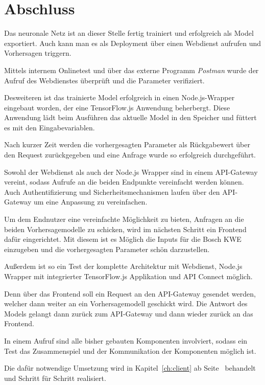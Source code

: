 \section{Abschluss}
Das neuronale Netz ist an dieser Stelle fertig trainiert und erfolgreich als Model exportiert. Auch kann man es als
Deployment über einen Webdienst aufrufen und Vorhersagen triggern.

Mittels internem Onlinetest und über das externe Programm \textit{Postman} wurde der Aufruf des Webdienstes überprüft
und die Parameter verifiziert.

Desweiteren ist das trainierte Model erfolgreich in einen Node.js-Wrapper eingebaut worden, der eine TensorFlow.js
Anwendung beherbergt. Diese Anwendung lädt beim Ausführen das aktuelle Model in den Speicher und füttert es mit den
Eingabevariablen.

Nach kurzer Zeit werden die vorhergesagten Parameter als Rückgabewert über den Request zurückgegeben und eine Anfrage
wurde so erfolgreich durchgeführt.

Sowohl der Webdienst als auch der Node.js Wrapper sind in einem API-Gateway vereint, sodass Aufrufe an die beiden
Endpunkte vereinfacht werden können. Auch Authentifizierung und Sicherheitsmechanismen laufen über den API-Gateway um
eine Anpassung zu vereinfachen.

Um dem Endnutzer eine vereinfachte Möglichkeit zu bieten, Anfragen an die beiden Vorhersagemodelle zu schicken, wird
im nächsten Schritt ein Frontend dafür eingerichtet. Mit diesem ist es Möglich die Inputs für die Bosch KWE einzugeben
und die vorhergesagten Parameter schön darzustellen.

Außerdem ist so ein Test der komplette Architektur mit Webdienst, Node.js Wrapper mit integrierter TensorFlow.js
Applikation und API Connect möglich.

Denn über das Frontend soll ein Request an den API-Gateway gesendet werden, welcher dann weiter an ein Vorhersagemodell
geschickt wird. Die Antwort des Models gelangt dann zurück zum API-Gateway und dann wieder zurück an das Frontend.

In einem Aufruf sind alle bisher gebauten Komponenten involviert, sodass ein Test das Zusammenspiel und der
Kommunikation der Komponenten möglich ist.

Die dafür notwendige Umsetzung wird in Kapitel~\ref{ch:client} ab Seite~\pageref{ch:client} behandelt und Schritt für
Schritt realisiert.